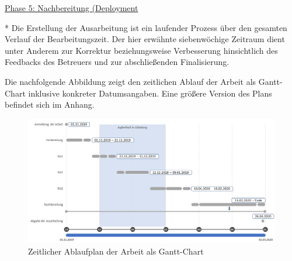 \underline{Phase 5: Nachbereitung (Deployment}
\begin{table}[H]
\label{tab:phase5}
\end{table}

* Die Erstellung der Ausarbeitung ist ein laufender Prozess über den gesamten Verlauf der Bearbeitungszeit. Der hier erwähnte siebenwöchige Zeitraum dient unter Anderem zur Korrektur beziehungsweise Verbesserung hinsichtlich des Feedbacks des Betreuers und zur abschließenden Finalisierung.

Die nachfolgende Abbildung zeigt den zeitlichen Ablauf der Arbeit als Gantt-Chart inklusive konkreter Datumsangaben. Eine größere Version des Plans befindet sich im Anhang.

\begin{figure}[H]
    \centering
    \includegraphics[width=\textwidth]{images/Zeit}
    \caption{Zeitlicher Ablaufplan der Arbeit als Gantt-Chart}\label{fig:zeit}
\end{figure}

